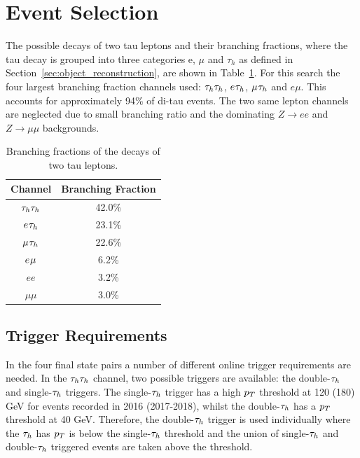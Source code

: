 \newpage
\section{Event Selection}

The possible decays of two tau leptons and their branching fractions, where the tau decay is grouped into three categories e, $\mu$ and $\tau_h$ as defined in Section~\ref{sec:object_reconstruction}, are shown in Table~\ref{tab:ditau_br}. 
For this search the four largest branching fraction channels used: $\tau_{h}\tau_{h}$, $e_{}\tau_{h}$, $\mu_{}\tau_{h}$ and $e\mu$.
This accounts for approximately 94\% of di-tau events.
The two same lepton channels are neglected due to small branching ratio and the dominating $Z\rightarrow ee$ and $Z\rightarrow \mu\mu$ backgrounds. \\

\begin{table}[!hbtp]
    \centering
    \begin{tabular}{|c|c|}
         \hline
         Channel & Branching Fraction  \\
         \hline
         \hline
         $\tau_{h}\tau_{h}$ & 42.0\% \\
         $e_{}\tau_{h}$ & 23.1\% \\
         $\mu_{}\tau_{h}$ & 22.6\% \\
         $e_{}\mu_{}$ & 6.2\% \\
         $e e$ & 3.2\% \\
         $\mu \mu$ & 3.0\% \\
         \hline
    \end{tabular}
    \caption{Branching fractions of the decays of two tau leptons.}
    \label{tab:ditau_br}
\end{table}

\subsection{Trigger Requirements}

In the four final state pairs a number of different online trigger requirements are needed.
In the $\tau_{h}\tau_{h}$ channel, two possible triggers are available: the double-$\tau_{h}$ and single-$\tau_{h}$ triggers.
The single-$\tau_{h}$ trigger has a high $p_{T}$ threshold at 120 (180) GeV for events recorded in 2016 (2017-2018), whilst the double-$\tau_{h}$ has a $p_{T}$ threshold at 40 GeV.
Therefore, the double-$\tau_{h}$ trigger is used individually where the $\tau_{h}$ has $p_{T}$ is below the single-$\tau_{h}$ threshold and the union of single-$\tau_{h}$ and double-$\tau_{h}$ triggered events are taken above the threshold. \\

